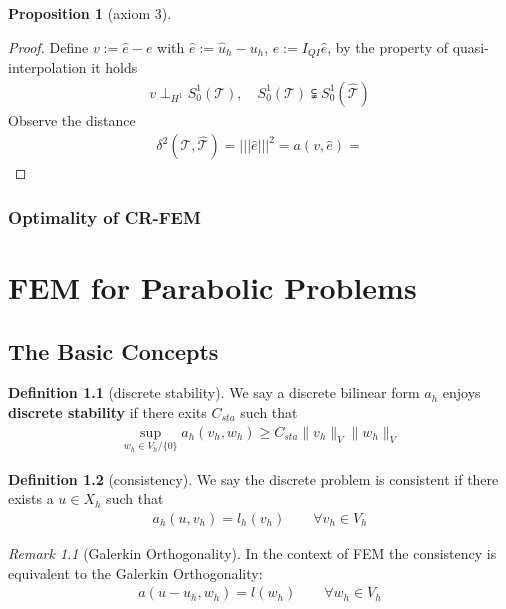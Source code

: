 \documentclass[a4paper,12pt,oneside,fleqn]{book}
\newtheorem{proposition}[theorem]{Proposition}
\theoremstyle{definition}
\newtheorem{definition}{Definition}[section]
\theoremstyle{remark}
\newtheorem*{remark}{Remark}
\begin{document}
\begin{proposition}[axiom 3]
	
\end{proposition}
\begin{proof}
	Define $v := \hat{e} - e$ with $\hat{e} := \hat{u}_h - u_h$, $e := I_{QI} \hat{e}$, by the property of quasi-interpolation it holds
	\begin{align*}
		v \perp_{H^1} S^1_0(\mathcal{T}), \quad S_0^1(\mathcal{T})  \subsetneqq S_0^1(\hat{\mathcal{T}}) 
	\end{align*} 
	Observe the distance
	\begin{align*}
		\delta^2(\mathcal{T}, \hat{\mathcal{T}}) = ||| \hat{e}|||^2 = a(v, \hat{e}) = 
	\end{align*}
\end{proof}








\subsection{Optimality of CR-FEM}




\chapter{FEM for Parabolic Problems}
\section{The Basic Concepts}
\begin{definition}[discrete stability]
	We say a discrete bilinear form $a_h$ enjoys \textbf{discrete stability} if there exits $C_{sta}$ such that
	\begin{align*}
		\sup_{w_h \in V_h \slash \{0\}} a_h(v_h, w_h) \ge C_{sta} \|v_h\|_V \|w_h\|_V
	\end{align*}
\end{definition}

\begin{definition}[consistency]
	We say the discrete problem is consistent if there exists a $u \in X_h$ such that
	\begin{align*}
		a_h(u, v_h) = l_h(v_h) \qquad \forall v_h \in V_h
	\end{align*}
\end{definition}
\begin{remark}[Galerkin Orthogonality]
In the context of FEM the consistency is equivalent to the Galerkin Orthogonality:
\begin{align*}
	a(u - u_h, w_h) = l(w_h) \qquad \forall w_h \in V_h
\end{align*}
\end{remark}
\end{document}
